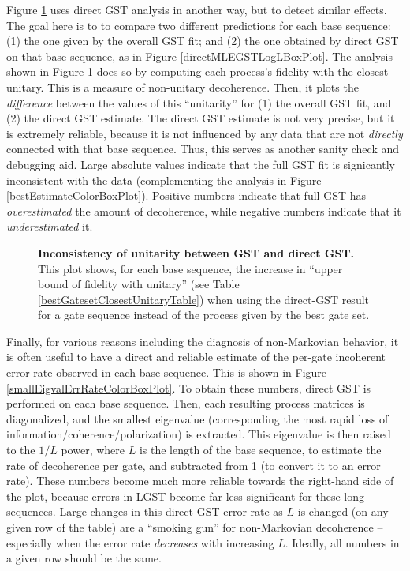 {Figure \ref{directMLEGSTDeviationBoxPlot} uses direct GST analysis in another way, but to detect similar effects.   The goal here is to to compare two different predictions for each base sequence:  (1) the one given by the overall GST fit; and (2) the one obtained by direct GST on that base sequence, as in Figure \ref{directMLEGSTLogLBoxPlot}.  The analysis shown in Figure \ref{directMLEGSTDeviationBoxPlot} does so by computing each process's fidelity with the closest unitary.  This is a measure of non-unitary decoherence.  Then, it plots the \emph{difference} between the values of this ``unitarity'' for (1) the overall GST fit, and (2) the direct GST estimate.  The direct GST estimate is not very precise, but it is extremely reliable, because it is not influenced by any data that are not \emph{directly} connected with that base sequence.  Thus, this serves as another sanity check and debugging aid.  Large absolute values indicate that the full GST fit is signicantly inconsistent with the data (complementing the analysis in Figure \ref{bestEstimateColorBoxPlot}).  Positive numbers indicate that full GST has \emph{overestimated} the amount of decoherence, while negative numbers indicate that it \emph{underestimated} it.

\begin{figure}
\begin{center}
\caption{\textbf{Inconsistency of unitarity between GST and direct GST.}  This plot shows, for each base sequence, the increase in ``upper bound of fidelity with unitary'' (see Table \ref{bestGatesetClosestUnitaryTable}) when using the direct-GST result for a gate sequence instead of the process given by the best gate set.\label{directMLEGSTDeviationBoxPlot}}
\end{center}
\end{figure}

Finally, for various reasons including the diagnosis of non-Markovian behavior, it is often useful to have a direct and reliable estimate of the per-gate incoherent error rate observed in each base sequence.  This is shown in Figure \ref{smallEigvalErrRateColorBoxPlot}.  To obtain these numbers, direct GST is performed on each base sequence.  Then, each resulting process matrices is diagonalized, and the smallest eigenvalue (corresponding the most rapid loss of information/coherence/polarization) is extracted.  This eigenvalue is then raised to the $1/L$ power, where $L$ is the length of the base sequence, to estimate the rate of decoherence per gate, and subtracted from 1 (to convert it to an error rate).  These numbers become much more reliable towards the right-hand side of the plot, because errors in LGST become far less significant for these long sequences.  Large changes in this direct-GST error rate as $L$ is changed (on any given row of the table) are a ``smoking gun'' for non-Markovian decoherence -- especially when the error rate \emph{decreases} with increasing $L$.  Ideally, all numbers in a given row should be the same.

}
